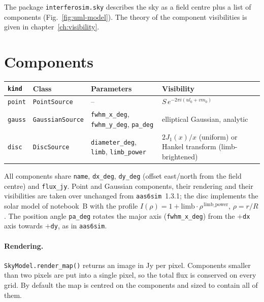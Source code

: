\label{ch:sky-models}
The package \texttt{interferosim.sky} describes the sky as a field centre
plus a list of components (Fig.~\ref{fig:uml-model}). The theory of the
component visibilities is given in chapter~\ref{ch:visibility}.

\section{Components}

\begin{center}
\begin{tabularx}{\linewidth}{@{}llLL@{}}
\toprule
\texttt{kind} & Class & Parameters & Visibility \\
\midrule
\texttt{point} & \texttt{PointSource} & -- & $S\,e^{-2\pi i(ul_0+vm_0)}$ \\
\texttt{gauss} & \texttt{GaussianSource} & \texttt{fwhm\_x\_deg}, \texttt{fwhm\_y\_deg}, \texttt{pa\_deg}
               & elliptical Gaussian, analytic \\
\texttt{disc}  & \texttt{DiscSource} & \texttt{diameter\_deg}, \texttt{limb}, \texttt{limb\_power}
               & $2J_1(x)/x$ (uniform) or Hankel transform (limb-brightened) \\
\bottomrule
\end{tabularx}
\end{center}

All components share \texttt{name}, \texttt{dx\_deg}, \texttt{dy\_deg}
(offset east/north from the field centre) and \texttt{flux\_jy}. Point and
Gaussian components, their rendering and their visibilities are taken over
unchanged from \texttt{aas6sim}~1.3.1; the disc implements the solar model
of notebook~B with the profile $I(\rho) = 1 + \mathrm{limb}\cdot
\rho^{\,\mathrm{limb\_power}}$, $\rho = r/R$. The position angle
\texttt{pa\_deg} rotates the major axis (\texttt{fwhm\_x\_deg}) from the
$+$\texttt{dx} axis towards $+$\texttt{dy}, as in \texttt{aas6sim}.

\paragraph*{Rendering.} \texttt{SkyModel.render\_map()} returns an image in
Jy per pixel. Components smaller than two pixels are put into a single
pixel, so the total flux is conserved on every grid. By default the map
is centred on the components and sized to contain all of them.

